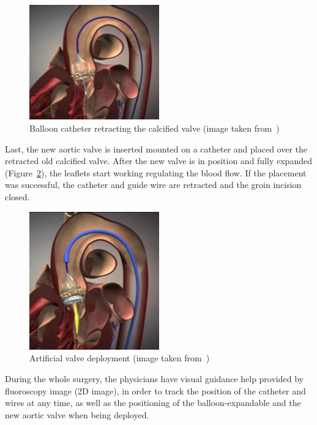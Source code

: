 \begin{figure}[ht]
   \centering
   \includegraphics[width=0.5\textwidth]{img/TAVIBallon.PNG}
   \caption{Balloon catheter retracting the calcified valve (image taken from~\protect\cite{tavivideo})}
   \label{img:TAVIBalloon}
\end{figure}

Last, the new aortic valve is inserted mounted on a catheter and placed over the retracted old calcified valve. After the new valve is in position and fully expanded  (Figure~\ref{img:TAVIValve}), the leaflets start working regulating the blood flow. If the placement was successful, the catheter and guide wire are retracted and the groin incision closed.\\

\begin{figure}[ht]
   \centering
   \includegraphics[width=0.5\textwidth]{img/TAVIValve.PNG}
   \caption{Artificial valve deployment (image taken from~\protect\cite{tavivideo})}
   \label{img:TAVIValve}
\end{figure}

During the whole surgery, the physicians have visual guidance help provided by fluoroscopy image (2D image), in order to track the position of the catheter and wires at any time, as well as the positioning of the balloon-expandable and the new aortic valve when being deployed.\\
\clearpage

